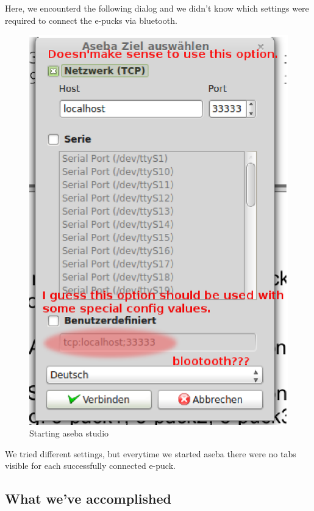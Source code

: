 \documentclass[12pt]{article}
\begin{document}
Here, we encounterd the following dialog and we didn't know which settings were required to connect the e-pucks via bluetooth.
\begin{figure}[!htb]
\centering
\includegraphics[scale=0.5]{aseba.eps} 
\caption{Starting aseba studio}
\end{figure}

We tried different settings, but everytime we started aseba there were no tabs visible for each successfully connected e-puck.

\subsection*{What we've accomplished}
\end{document}
